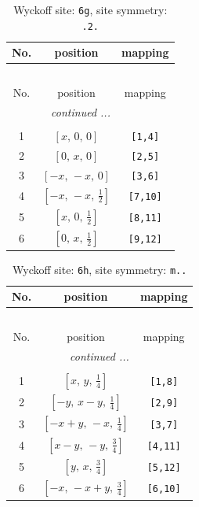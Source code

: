 \documentclass[fleqn,8pt]{jsarticle}
\begin{document}
\renewcommand{\arraystretch}{1.2}
\begin{longtable}{ccc}
\caption{Wyckoff site: {\tt 6g}, site symmetry: {\tt .2.}}
 \\
 \hline \hline
No. & position & mapping \\ \hline \endfirsthead

\multicolumn{2}{l}{\tablename\ \thetable{}} \\
 \hline \hline
No. & position & mapping \\ \hline \endhead

 \hline \hline
\multicolumn{2}{r}{\footnotesize\it continued ...} \\ \endfoot

 \hline \hline
\multicolumn{2}{r}{} \\ \endlastfoot

1 & $\left[ x,\, 0,\, 0 \right]$ & {\tt [1,4]} \\ \hline
2 & $\left[ 0,\, x,\, 0 \right]$ & {\tt [2,5]} \\ \hline
3 & $\left[ - x,\, - x,\, 0 \right]$ & {\tt [3,6]} \\ \hline
4 & $\left[ - x,\, - x,\, \frac{1}{2} \right]$ & {\tt [7,10]} \\ \hline
5 & $\left[ x,\, 0,\, \frac{1}{2} \right]$ & {\tt [8,11]} \\ \hline
6 & $\left[ 0,\, x,\, \frac{1}{2} \right]$ & {\tt [9,12]} \\
\end{longtable}
\renewcommand{\arraystretch}{1.2}
\begin{longtable}{ccc}
\caption{Wyckoff site: {\tt 6h}, site symmetry: {\tt m..}}
 \\
 \hline \hline
No. & position & mapping \\ \hline \endfirsthead

\multicolumn{2}{l}{\tablename\ \thetable{}} \\
 \hline \hline
No. & position & mapping \\ \hline \endhead

 \hline \hline
\multicolumn{2}{r}{\footnotesize\it continued ...} \\ \endfoot

 \hline \hline
\multicolumn{2}{r}{} \\ \endlastfoot

1 & $\left[ x,\, y,\, \frac{1}{4} \right]$ & {\tt [1,8]} \\ \hline
2 & $\left[ - y,\, x - y,\, \frac{1}{4} \right]$ & {\tt [2,9]} \\ \hline
3 & $\left[ - x + y,\, - x,\, \frac{1}{4} \right]$ & {\tt [3,7]} \\ \hline
4 & $\left[ x - y,\, - y,\, \frac{3}{4} \right]$ & {\tt [4,11]} \\ \hline
5 & $\left[ y,\, x,\, \frac{3}{4} \right]$ & {\tt [5,12]} \\ \hline
6 & $\left[ - x,\, - x + y,\, \frac{3}{4} \right]$ & {\tt [6,10]} \\
\end{longtable}
\end{document}
